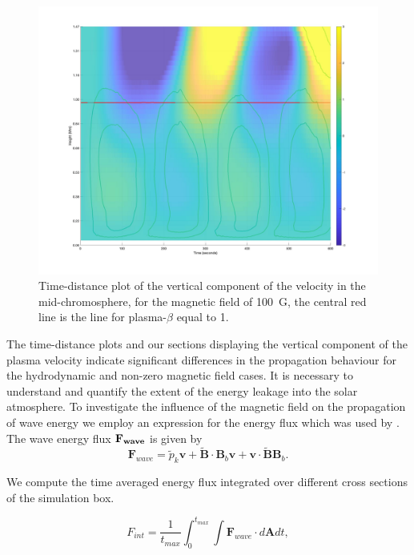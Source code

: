 \documentclass[physics,article,submit,pdftex,moreauthors]{Definitions/mdpi}
\begin{document}
\begin{figure}
\centering
\label{td_vert_dif_bv0G_100G_300}
\includegraphics[scale=0.163]{td_vert_bv100G_300_with_bandbeta.jpeg}
\caption{Time-distance plot of the vertical component of the velocity in the mid-chromosphere, for the magnetic field of 100~G, the central red line is the line for plasma-$\beta$  equal to 1.}
\end{figure}

The time-distance plots and our sections displaying the vertical component of the plasma velocity indicate significant differences in the propagation behaviour for the hydrodynamic and non-zero magnetic field cases. It is necessary to understand and quantify the extent of the energy leakage into the solar atmosphere. To investigate the influence of the magnetic field on the propagation of wave energy we employ an expression for the energy flux which was used by \cite{Bogdan2003}. The wave energy flux $\bf{F}_{wave}$ is given by
$$
{\mathbf F}_{wave}=\tilde{p}_{k} {\mathbf v}+\tilde{\mathbf B}\cdot {\mathbf B_{b}}{\mathbf v}+{\mathbf v}\cdot \tilde{\mathbf B}{\mathbf B_{b}} .
$$

We compute the time averaged energy flux integrated over different cross sections of the simulation box.

\begin{equation}
F_{int}= \frac{1}{t_{max}} \int_{0}^{t_{max}} \int {\mathbf F}_{wave} \cdot d{\mathbf A}dt,
\label{e11}
\end{equation}
\end{document}
